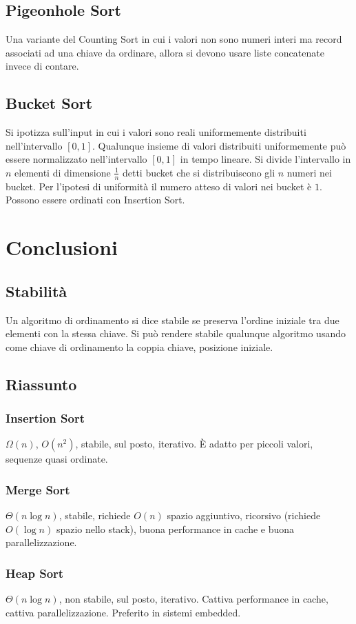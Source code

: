 \subsection{Pigeonhole Sort}
Una variante del Counting Sort in cui i valori non sono numeri interi ma record associati ad una chiave da ordinare, allora si devono usare liste concatenate invece di contare. 
\subsection{Bucket Sort}
Si ipotizza sull'input in cui i valori sono reali uniformemente distribuiti nell'intervallo $[0, 1]$. Qualunque insieme di valori distribuiti uniformemente pu\`o essere normalizzato
nell'intervallo $[0, 1]$ in tempo lineare. Si divide l'intervallo in $n$ elementi di dimensione $\frac{1}{n}$ detti bucket che si distribuiscono gli $n$ numeri nei bucket. Per l'ipotesi 
di uniformit\`a il numero atteso di valori nei bucket \`e $1$. Possono essere ordinati con Insertion Sort. 
\section{Conclusioni}
\subsection{Stabilit\`a}
Un algoritmo di ordinamento si dice stabile se preserva l'ordine iniziale tra due elementi con la stessa chiave. Si pu\`o rendere stabile qualunque algoritmo usando come chiave di 
ordinamento la coppia chiave, posizione iniziale. 
\subsection{Riassunto}
\subsubsection{Insertion Sort}
$\Omega(n)$, $O(n^2)$, stabile, sul posto, iterativo. \`E adatto per piccoli valori, sequenze quasi ordinate. 
\subsubsection{Merge Sort}
$\Theta(n\log n)$, stabile, richiede $O(n)$ spazio aggiuntivo, ricorsivo (richiede $O(\log n)$ spazio nello stack), buona performance in cache e buona parallelizzazione. 
\subsubsection{Heap Sort}
$\Theta(n\log n)$, non stabile, sul posto, iterativo. Cattiva performance in cache, cattiva parallelizzazione. Preferito in sistemi embedded. 
